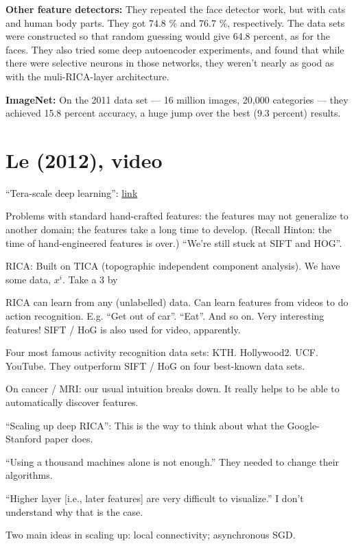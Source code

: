 \documentclass[12pt]{report}
\newcommand{\link}[2]{\href{#1}{#2}}
\begin{document}
\textbf{Other feature detectors:} They repeated the face detector
work, but with cats and human body parts.  They got 74.8 \% and 76.7
\%, respectively.  The data sets were constructed so that random
guessing would give 64.8 percent, as for the faces.  They also tried
some deep autoencoder experiments, and found that while there were
selective neurons in those networks, they weren't nearly as good as
with the muli-RICA-layer architecture.

\textbf{ImageNet:} On the 2011 data set --- 16 million images, 20,000
categories --- they achieved 15.8 percent accuracy, a huge jump over
the best (9.3 percent) results.

\section{Le (2012), video}

``Tera-scale deep learning'': \link{http://vimeo.com/52332329}{link}

Problems with standard hand-crafted features: the features may not
generalize to another domain; the features take a long time to
develop.  (Recall Hinton: the time of hand-engineered features is
over.)  ``We're still stuck at SIFT and HOG''.  

RICA: Built on TICA (topographic independent component analysis).  We
have some data, $x^i$.  Take a 3 by 

RICA can learn from any (unlabelled) data.  Can learn features from
videos to do action recognition.  E.g. ``Get out of car''.  ``Eat''.
And so on.  Very interesting features!  SIFT / HoG is also used for
video, apparently.

Four most famous activity recognition data sets: KTH.
Hollywood2. UCF. YouTube.  They outperform SIFT / HoG on four
best-known data sets.

On cancer / MRI: our usual intuition breaks down.  It really helps to
be able to automatically discover features.

``Scaling up deep RICA'': This is the way to think about what the
Google-Stanford paper does.

``Using a thousand machines alone is not enough.''  They needed to
change their algorithms.  

``Higher layer [i.e., later features] are very difficult to
visualize.''  I don't understand why that is the case.

Two main ideas in scaling up: local connectivity; asynchronous SGD.  
\end{document}
